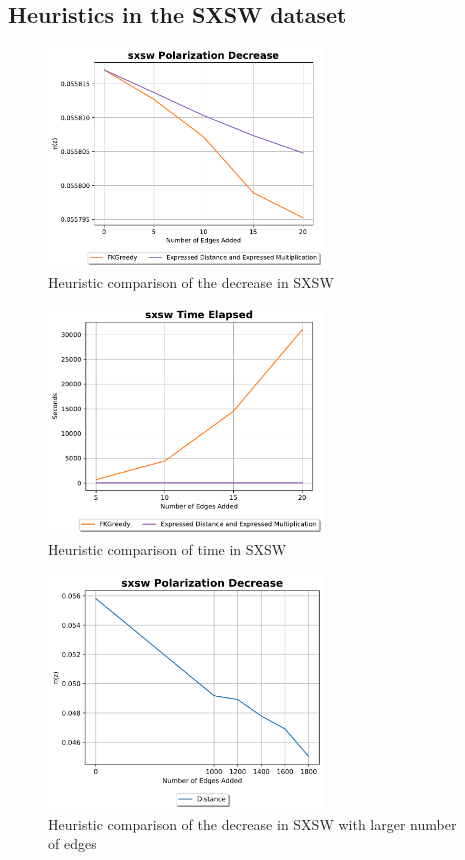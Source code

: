 \begin{table}[H]
\subsection{Heuristics in the SXSW dataset}
\begin{figure}[H]
	\centering
	\includegraphics[width=0.65\textwidth]{Figures/sxsw Polarization Decrease}
	\caption{Heuristic comparison of the decrease in SXSW}
	\label{fig:sxsw_pol}
\end{figure}


\begin{figure}[H]
	\centering
	\includegraphics[width=0.65\textwidth]{Figures/sxsw Time Elapsed}
	\caption{Heuristic comparison of time in SXSW}
	\label{fig:sxsw_time}
\end{figure}

\clearpage

\begin{figure}[H]
	\centering
	\includegraphics[width=0.65\textwidth]{Figures/sxsw Polarization Decrease 2}
	\caption{Heuristic comparison of the decrease in SXSW with larger number of edges}
	\label{fig:sxsw_pol}
\end{figure}



\end{table}
